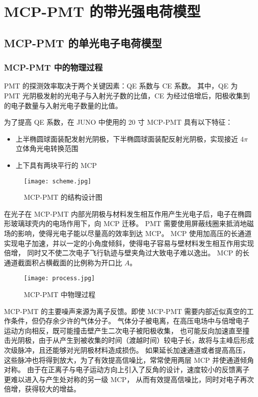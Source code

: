 
\chapter{MCP-PMT 的带光强电荷模型}

\section{MCP-PMT 的单光电子电荷模型}
\subsection{MCP-PMT 中的物理过程}\label{sec:mcp-pmt-process}
PMT 的探测效率取决于两个关键因素：QE 系数与 CE 系数。
其中，QE 为 PMT 光阴极发射的光电子与入射光子数的比值，CE 为经过倍增后，阳极收集到的电子数量与入射光电子数量的比值。

为了提高 QE 系数，在 JUNO 中使用的 20 寸 MCP-PMT 具有以下特征：
\begin{itemize}
    \item 上半椭圆球面装配发射光阴极，下半椭圆球面装配反射光阴极，实现接近 $4\pi$ 立体角光电转换范围
    \item 上下具有两块平行的 MCP
\end{itemize}

\begin{figure}
    \centering
    \texttt{[image: scheme.jpg]}
    \caption{MCP-PMT 的结构设计图\cite{wangNewDesignLarge2012}}
\end{figure}

在光子在 MCP-PMT 内部光阴极与材料发生相互作用产生光电子后，电子在椭圆形玻璃球壳内的电场作用下，向 MCP 迁移。
PMT 需要使用屏蔽线圈来抵消地磁场的影响，使得光电子能以尽量高的效率到达 MCP。
MCP 使用加高压的长通道实现电子加速，并以一定的小角度倾斜，使得电子容易与壁材料发生相互作用实现倍增，
同时又不使二次电子飞行轨迹与壁夹角过大致电子难以逸出。
MCP 的长通道截面积占横截面的比例称为开口比 $A$。

\begin{figure}
    \centering
    \texttt{[image: process.jpg]}
    \caption{MCP-PMT 中物理过程\cite{chenPhotoelectronBackscatteringMicrochannel2018}}
\end{figure}

MCP-PMT 的主要噪声来源为离子反馈\cite{MaterialStore2010}。即使 MCP-PMT 需要内部近似真空的工作条件，但仍存余少许的气体分子。
气体分子被电离，在高压电场中与倍增电子运动方向相反，既可能撞击壁产生二次电子被阳极收集，
也可能反向加速直至撞击光阴极，由于从产生到被收集的时间（渡越时间）较电子长，故将与主峰后形成次级脉冲，且还能够对光阴极材料造成损伤。
如果延长加速通道或者提高高压，这些脉冲也将得到放大，为了有效提高信噪比，常常使用两层 MCP 并使通道倾角对称。
由于在正离子与电子运动方向上引入了反角的设计，速度较小的反馈离子更难以进入与产生处对称的另一级 MCP，
从而有效提高信噪比，同时对电子再次倍增，获得较大的增益。

